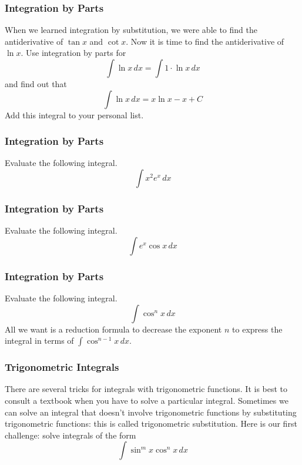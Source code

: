 \documentclass[xcolor=dvipsnames]{beamer}
\begin{document}
\begin{frame}
  \frametitle{Integration by Parts}
  When we learned integration by substitution, we were able to find
  the antiderivative of $\tan{}x$ and $\cot{}x$. Now it is time to
  find the antiderivative of $\ln{}x$. Use integration by parts for
  \begin{equation}
    \label{eq:xoocheix}
    \int\ln{}x\,dx=\int{}1\cdot\ln{}x\,dx
  \end{equation}
  and find out that
  \begin{equation}
    \label{eq:eimejief}
    \int\ln{}x\,dx=x\ln{}x-x+C
  \end{equation}
Add this integral to your personal list.
\end{frame}

\begin{frame}
  \frametitle{Integration by Parts}
  {\ubung} Evaluate the following integral.
  \begin{equation}
    \label{eq:oizaixea}
    \int{}x^{2}e^{x}\,dx
  \end{equation}
\end{frame}

\begin{frame}
  \frametitle{Integration by Parts}
  {\ubung} Evaluate the following integral.
  \begin{equation}
    \label{eq:nohceira}
    \int{}e^{x}\cos{}x\,dx
  \end{equation}
\end{frame}

\begin{frame}
  \frametitle{Integration by Parts}
  {\ubung} Evaluate the following integral.
  \begin{equation}
    \label{eq:aemahjoo}
    \int\cos^{n}x\,dx
  \end{equation}
  All we want is a \alert{reduction formula} to decrease the exponent
  $n$ to express the integral in terms of $\int\cos^{n-1}x\,dx$.
\end{frame}

\begin{frame}
  \frametitle{Trigonometric Integrals}
  There are several tricks for integrals with trigonometric functions.
  It is best to consult a textbook when you have to solve a particular
  integral. Sometimes we can solve an integral that doesn't involve
  trigonometric functions by substituting trigonometric functions:
  this is called trigonometric substitution. Here is our first
  challenge: solve integrals of the form
  \begin{equation}
    \label{eq:iepheith}
    \int\sin^{m}x\cos^{n}x\,dx
  \end{equation}
\end{frame}
\end{document}
